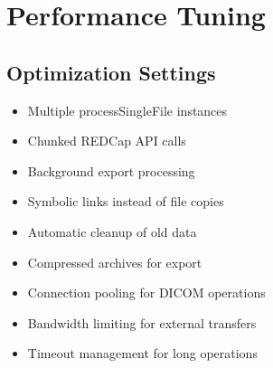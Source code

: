 \documentclass[letterpaper,10pt,english]{sphinxmanual}
\begin{document}
\section{Performance Tuning}
\label{\detokenize{Temp/admin-options:performance-tuning}}

\subsection{Optimization Settings}
\label{\detokenize{Temp/admin-options:optimization-settings}}\begin{description}
\begin{itemize}
\item {} 
\sphinxAtStartPar
Multiple processSingleFile instances

\item {} 
\sphinxAtStartPar
Chunked REDCap API calls

\item {} 
\sphinxAtStartPar
Background export processing

\end{itemize}

\begin{itemize}
\item {} 
\sphinxAtStartPar
Symbolic links instead of file copies

\item {} 
\sphinxAtStartPar
Automatic cleanup of old data

\item {} 
\sphinxAtStartPar
Compressed archives for export

\end{itemize}

\begin{itemize}
\item {} 
\sphinxAtStartPar
Connection pooling for DICOM operations

\item {} 
\sphinxAtStartPar
Bandwidth limiting for external transfers

\item {} 
\sphinxAtStartPar
Timeout management for long operations

\end{itemize}

\end{description}
\end{document}
